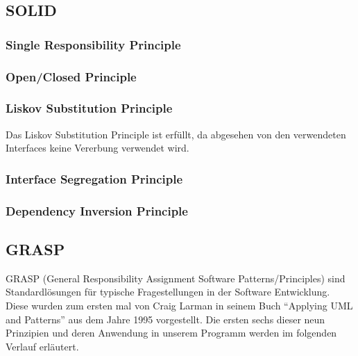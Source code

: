 \subsection{SOLID}
\subsubsection{Single Responsibility Principle}

\subsubsection{Open/Closed Principle}

\subsubsection{Liskov Substitution Principle}
Das Liskov Substitution Principle ist erfüllt, da abgesehen von den verwendeten Interfaces keine Vererbung verwendet wird.
\subsubsection{Interface Segregation Principle}

\subsubsection{Dependency Inversion Principle}

\subsection{GRASP}
GRASP (General Responsibility Assignment Software Patterns/Principles) sind Standardlösungen für typische Fragestellungen in der Software Entwicklung.
Diese wurden zum ersten mal von Craig Larman in seinem Buch \enquote{Applying UML and Patterns} aus dem Jahre 1995 vorgestellt.
Die ersten sechs dieser neun Prinzipien und deren Anwendung in unserem Programm werden im folgenden Verlauf erläutert.

